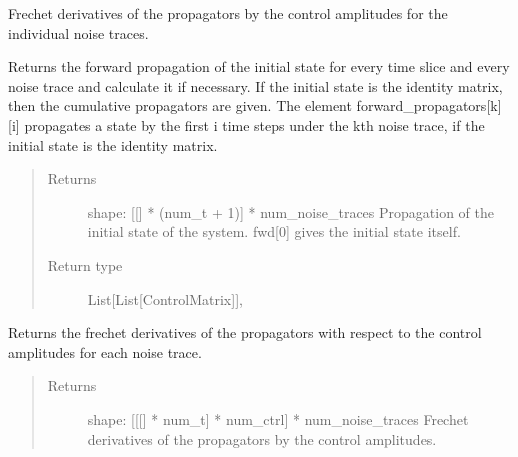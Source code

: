 \documentclass[letterpaper,10pt,english]{sphinxmanual}
\begin{document}
\begin{fulllineitems}
\begin{fulllineitems}
Frechet derivatives of the propagators by the control amplitudes for
the individual noise traces.

\end{fulllineitems}


\begin{fulllineitems}
\label{\detokenize{qsim:qsim.solver_algorithms.SchroedingerSMonteCarlo.forward_propagators_noise}}
Returns the forward propagation of the initial state for every time
slice and every noise trace and calculate it if necessary. If the
initial state is the identity matrix, then the cumulative propagators
are given. The element forward\_propagators{[}k{]}{[}i{]} propagates a state by
the first i time steps under the kth noise trace, if the initial state
is the identity matrix.
\begin{quote}\begin{description}
\item[{Returns}] \leavevmode
{} \textendash{}          shape: {[}{[}{]} * (num\_t + 1){]} * num\_noise\_traces
Propagation of the initial state of the system. fwd{[}0{]} gives the
initial state itself.

\item[{Return type}] \leavevmode
List{[}List{[}ControlMatrix{]}{]},

\end{description}\end{quote}

\end{fulllineitems}


\begin{fulllineitems}
\label{\detokenize{qsim:qsim.solver_algorithms.SchroedingerSMonteCarlo.frechet_deriv_propagators_noise}}
Returns the frechet derivatives of the propagators with respect to the
control amplitudes for each noise trace.
\begin{quote}\begin{description}
\item[{Returns}] \leavevmode
{} \textendash{}                 shape: {[}{[}{[}{]} * num\_t{]} * num\_ctrl{]} * num\_noise\_traces
Frechet derivatives of the propagators by the control amplitudes.


\end{description}
\end{quote}
\end{fulllineitems}
\end{fulllineitems}
\end{document}
